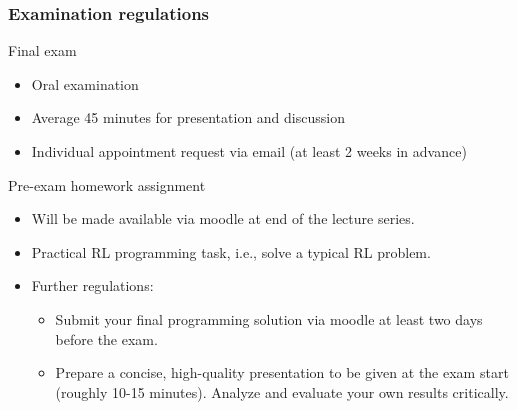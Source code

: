 \begin{frame}
\frametitle{Examination regulations}
\begin{block}{Final exam}
\begin{itemize}
	\item Oral examination 
	\item Average 45 minutes for presentation and discussion
	\item Individual appointment request via email (at least 2 weeks in advance)
\end{itemize}
\end{block}
\pause
\begin{block}{Pre-exam homework assignment}
\begin{itemize}
	\item Will be made available via moodle at end of the lecture series.
	\item Practical RL programming task, i.e., solve a typical RL problem.
	\item Further regulations:
	\begin{itemize}
		\item Submit your final programming solution via moodle at least two days before the exam.
		\item Prepare a concise, high-quality presentation to be given at the exam start (roughly 10-15 minutes). Analyze and evaluate your own results critically. 
	\end{itemize}
\end{itemize}
\end{block}
\end{frame}



